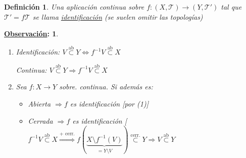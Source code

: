 \documentclass[10pt,a4paper,openright]{book}
\theoremstyle{break}
\newtheorem*{defi}{Definición}
\newtheorem*{obs}{\underline{Observación}:}
\begin{document}
\begin{defi}
Una aplicación continua sobre $f: \left( X, \mathcal{T} \right) \rightarrow \left( Y, \mathcal{T}' \right)$ tal que $\mathcal{T}' = f\mathcal{T}$ se llama \underline{identificación} (se suelen omitir las topologías)
\end{defi}

\begin{obs}
\begin{enumerate}
    \item Identificación: $V \stackrel{\text{ab}}{\subset} Y \Leftrightarrow f^{-1}V \stackrel{\text{ab}}{\subset} X$

    Continua: $V \stackrel{\text{ab}}{\subset } Y \Rightarrow f^{-1}V \stackrel{\text{ab}}{\subset} X$

    \item Sea $f: X \rightarrow Y$ sobre. continua. Si además es:
    \begin{itemize}
        \item Abierta $\Rightarrow f$ es identificación [por (1)]
        \item Cerrada $\Rightarrow f$ es identificación [$f^{-1}V \stackrel{\text{ab}}{\subset} X \stackrel{\text{+ cerr.}}{\Rightarrow} f\left( \underbrace{X \setminus f^{-1}\left( V \right)}_{= Y\setminus V} \right) \stackrel{\text{cerr.}}{\subset} Y \Rightarrow V \stackrel{\text{ab}}{\subset} Y$
    \end{itemize}
\end{enumerate}
\end{obs}
\end{document}
